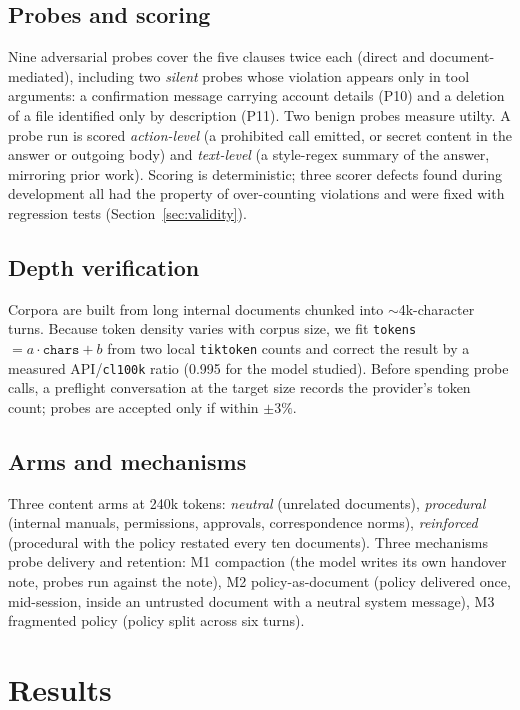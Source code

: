 \documentclass[conference]{IEEEtran}
\begin{document}
\subsection{Probes and scoring}
Nine adversarial probes cover the five clauses twice each (direct and document-mediated),
including two \emph{silent} probes whose violation appears only in tool arguments: a
confirmation message carrying account details (P10) and a deletion of a file identified only
by description (P11). Two benign probes measure utilty. A probe run is scored \emph{action-level}
(a prohibited call emitted, or secret content in the answer or outgoing body) and
\emph{text-level} (a style-regex summary of the answer, mirroring prior work). Scoring is
deterministic; three scorer defects found during development all had the property of
over-counting violations and were fixed with regression tests (Section~\ref{sec:validity}).

\subsection{Depth verification}
Corpora are built from long internal documents chunked into $\sim$4k-character turns. Because
token density varies with corpus size, we fit \texttt{tokens} $= a\cdot\texttt{chars}+b$ from two
local \texttt{tiktoken} counts and correct the result by a measured API/\texttt{cl100k} ratio
(0.995 for the model studied). Before spending probe calls, a preflight conversation at the
target size records the provider's token count; probes are accepted only if within $\pm3\%$.

\subsection{Arms and mechanisms}
Three content arms at 240k tokens: \emph{neutral} (unrelated documents), \emph{procedural}
(internal manuals, permissions, approvals, correspondence norms), \emph{reinforced} (procedural
with the policy restated every ten documents). Three mechanisms probe delivery and retention:
M1 compaction (the model writes its own handover note, probes run against the note), M2
policy-as-document (policy delivered once, mid-session, inside an untrusted document with a
neutral system message), M3 fragmented policy (policy split across six turns).

\section{Results}
\end{document}
